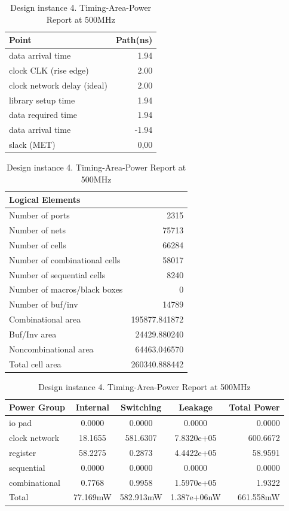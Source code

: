 \documentclass[journal,comsoc]{IEEEtran}
\begin{document}
\begin{table} 
	\vspace*{-1.1mm}%
	\centering
	\caption{Design instance 4. Timing-Area-Power Report at 500MHz}
	\begin{tabular}{@{}lr@{}}
		Point 						& Path(ns)\\
		\hline\hline
		data arrival time   		& 1.94\\ 
		clock CLK (rise edge)  		& 2.00\\
		clock network delay (ideal) & 2.00\\
		library setup time			& 1.94\\
		\hline
		data required time			& 1.94\\
		data arrival time           &-1.94\\
		\hline
		slack (MET)                 & 0,00\\	
		\hline
	\end{tabular}
	
	\begin{tabular}{@{}lr@{}}\\
		Logical Elements\\
		\hline\hline
		Number of ports               &2315\\
		Number of nets                &75713\\
		Number of cells               &66284\\
		Number of combinational cells &58017\\
		Number of sequential cells    &8240\\
		Number of macros/black boxes  &0\\
		Number of buf/inv             &14789\\
		\hline
		Combinational area            &195877.841872\\
		Buf/Inv area                  &24429.880240\\
		Noncombinational area         &64463.046570\\
		\hline
		Total cell area               &260340.888442\\	
		\hline
	\end{tabular}
	
	\begin{tabular}{@{}lcccr@{}}\\
		Power Group		 &Internal 	&Switching 	&Leakage		&Total Power\\
		\hline\hline
		io pad           &0.0000    &0.0000     &0.0000    		&0.0000\\
		clock network    &18.1655   &581.6307   &7.8320e+05 	&600.6672\\
		register         &58.2275   &0.2873     &4.4422e+05 	&58.9591\\  
		sequential       &0.0000    &0.0000     &0.0000     	&0.0000\\  
		combinational    &0.7768    &0.9958     &1.5970e+05 	&1.9322\\ 
		\hline
		Total            &77.169mW  &582.913mW  &1.387e+06nW	&661.558mW\\	
		\hline
	\end{tabular}
	\label{tab:rep_desgin4}
\end{table}
\end{document}

